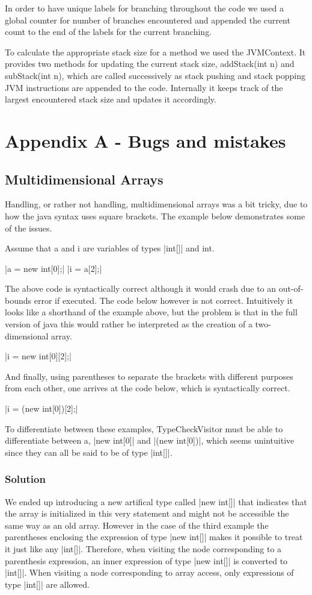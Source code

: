 \documentclass[paper=a4, fontsize=11pt]{scrartcl} %
\numberwithin{equation}{section} %
\numberwithin{figure}{section} %
\numberwithin{table}{section} %
\begin{document}
In order to have unique labels for branching throughout the code we used a global counter for number of branches encountered and appended the current count to the end of the labels for the current branching.

To calculate the appropriate stack size for a method we used the JVMContext. It provides two methods for updating the current stack size, addStack(int n) and subStack(int n), which are called successively as stack pushing and stack popping JVM instructions are appended to the code. Internally it keeps track of the largest encountered stack size and updates it accordingly.

\section{Appendix A - Bugs and mistakes}
\subsection*{Multidimensional Arrays}
Handling, or rather not handling, multidimensional arrays was a bit tricky, due to how the java syntax uses square brackets. The example below demonstrates some of the issues.

Assume that a and i are variables of types |int[]| and int.

|a = new int[0];|
|i = a[2];|

The above code is syntactically correct although it would crash due to an out-of-bounds error if executed. The code below however is not correct. Intuitively it looks like a shorthand of the example above, but the problem is that in the full version of java this would rather be interpreted as the creation of a two-dimensional array.

|i = new int[0][2];|

And finally, using parentheses to separate the brackets with different purposes from each other, one arrives at the code below, which is syntactically correct.

|i = (new int[0])[2];|

To differentiate between these examples, TypeCheckVisitor must be able to differentiate between a, |new int[0]| and |(new int[0])|, which seems unintuitive since they can all be said to be of type |int[]|.
\subsubsection*{Solution}
We ended up introducing a new artifical type called |new int[]| that indicates that the array is initialized in this very statement and might not be accessible the same way as an old array. However in the case of the third example the parentheses enclosing the expression of type |new int[]| makes it possible to treat it just like any |int[]|. Therefore, when visiting the node corresponding to a parenthesis expression, an inner expression of type |new int[]| is converted to |int[]|. When visiting a node corresponding to array access, only expressions of type |int[]| are allowed.
\end{document}
